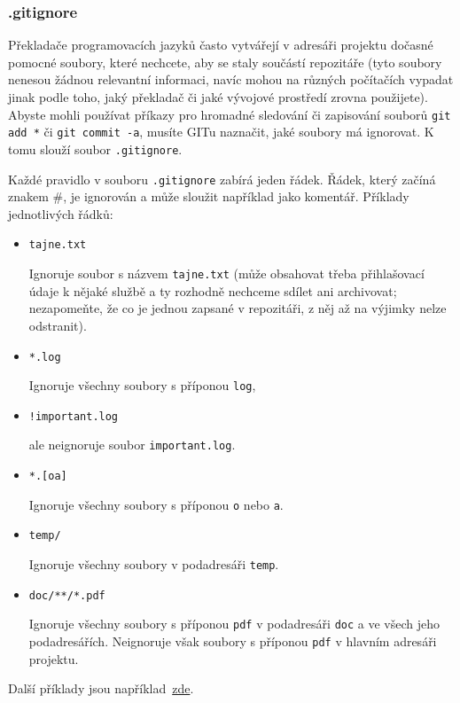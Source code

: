 \documentclass[a4paper,11pt,twoside]{article}
\def\code#1{\textnormal{\texttt{#1}}}
\theoremstyle{red}
\theoremstyle{green}
\begin{document}
\subsubsection{.gitignore}
\label{sec:gitignore}
    Překladače programovacích jazyků často vytvářejí v adresáři projektu dočasné pomocné soubory, které nechcete, aby se staly součástí repozitáře (tyto soubory nenesou žádnou relevantní informaci, navíc mohou na různých počítačích vypadat jinak podle toho, jaký překladač či jaké vývojové prostředí zrovna použijete).
    Abyste mohli používat příkazy pro hromadné sledování či zapisování souborů \code{git add *} či \code{git commit -a}, musíte GITu naznačit, jaké soubory má ignorovat.
    K tomu slouží soubor \code{.gitignore}.
    
    Každé pravidlo v souboru \code{.gitignore} zabírá jeden řádek.
    Řádek, který začíná znakem \#, je ignorován a může sloužit například jako komentář.
    Příklady jednotlivých řádků:
    \begin{itemize}
    \item \code{tajne.txt}
        
        Ignoruje soubor s názvem \code{tajne.txt} (může obsahovat třeba přihlašovací údaje k nějaké službě a ty rozhodně nechceme sdílet ani archivovat; nezapomeňte, že co je jednou zapsané v repozitáři, z něj až na výjimky nelze odstranit).

    \item \code{*.log}
    
        Ignoruje všechny soubory s příponou \code{log},

    \item \code{!important.log}

        ale neignoruje soubor \code{important.log}.

    \item \code{*.[oa]}

        Ignoruje všechny soubory s příponou \code{o} nebo \code{a}.

    \item \code{temp/}

        Ignoruje všechny soubory v podadresáři \code{temp}.

    \item \code{doc/**/*.pdf}
    
        Ignoruje všechny soubory s příponou \code{pdf} v podadresáři \code{doc} a ve všech jeho podadresářích.
        Neignoruje však soubory s příponou \code{pdf} v hlavním adresáři projektu.
    \end{itemize}
    Další příklady jsou například~\href{https://www.atlassian.com/git/tutorials/saving-changes/gitignore}{zde}.
\end{document}
